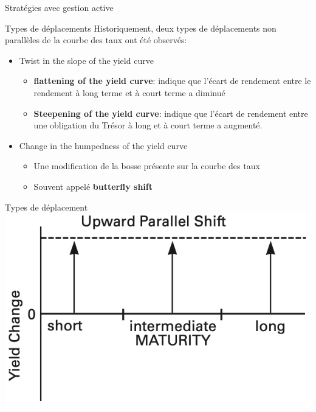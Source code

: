 \documentclass{beamer}
\begin{document}
\begin{frame}{Stratégies avec gestion active}
\begin{block}{Types de déplacements}
Historiquement, deux types de déplacements non parallèles de la courbe des taux ont été observés:
\begin{itemize}[label=\bullet]
\item Twist in the slope of the yield curve 
\begin{itemize}[label=-]
\item \textbf{flattening of the yield curve}: indique que l'écart de rendement entre le rendement à long terme et à court terme a diminué
\item \textbf{Steepening of the yield curve}: indique que l'écart de rendement entre une obligation du Trésor à long et à court terme a augmenté. 
\end{itemize}
\item Change in the humpedness of the yield curve
\begin{itemize}[label=-]
\item Une modification de la bosse présente sur la courbe des taux
\item Souvent appelé \textbf{butterfly shift}
\end{itemize}
\end{itemize}
\end{block}
\end{frame}



\begin{frame}{Types de déplacement}
\includegraphics{1}
\end{frame}
\end{document}
